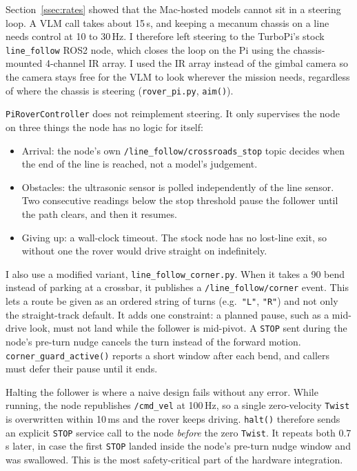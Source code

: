 \label{ssec:line_follower}

Section~\ref{ssec:rates} showed that the Mac-hosted models cannot sit in a
steering loop. A VLM call takes about 15\,s, and keeping a mecanum chassis on a
line needs control at 10 to 30\,Hz. I therefore left steering to the TurboPi's
stock \texttt{line\_follow} ROS2 node, which closes the loop on the Pi using the
chassis-mounted 4-channel IR array. I used the IR array instead of the gimbal
camera so the camera stays free for the VLM to look wherever the mission needs,
regardless of where the chassis is steering (\texttt{rover\_pi.py},
\texttt{aim()}).

\texttt{PiRoverController} does not reimplement steering. It only supervises the
node on three things the node has no logic for itself:
\begin{itemize}
  \item Arrival: the node's own \texttt{/line\_follow/crossroads\_stop} topic
    decides when the end of the line is reached, not a model's judgement.
  \item Obstacles: the ultrasonic sensor is polled independently of the line
    sensor. Two consecutive readings below the stop threshold pause the follower
    until the path clears, and then it resumes.
  \item Giving up: a wall-clock timeout. The stock node has no lost-line exit,
    so without one the rover would drive straight on indefinitely.
\end{itemize}

I also use a modified variant, \texttt{line\_follow\_corner.py}. When it takes a
90\textdegree{} bend instead of parking at a crossbar, it publishes a
\texttt{/line\_follow/corner} event. This lets a route be given as an ordered
string of turns (e.g.\ \texttt{"L"}, \texttt{"R"}) and not only the
straight-track default. It adds one constraint: a planned pause, such as a
mid-drive look, must not land while the follower is mid-pivot. A \texttt{STOP}
sent during the node's pre-turn nudge cancels the turn instead of the forward
motion. \texttt{corner\_guard\_active()} reports a short window after each bend,
and callers must defer their pause until it ends.

Halting the follower is where a naive design fails without any error. While
running, the node republishes \texttt{/cmd\_vel} at 100\,Hz, so a single
zero-velocity \texttt{Twist} is overwritten within 10\,ms and the rover keeps
driving. \texttt{halt()} therefore sends an explicit \texttt{STOP} service call
to the node \emph{before} the zero \texttt{Twist}. It repeats both 0.7\,s later,
in case the first \texttt{STOP} landed inside the node's pre-turn nudge window
and was swallowed. This is the most safety-critical part of the hardware
integration.

